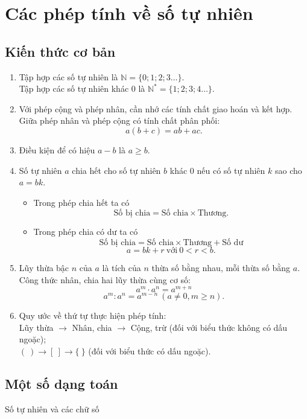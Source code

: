 
\section{Các phép tính về số tự nhiên}
\subsection{Kiến thức cơ bản}
\begin{enumerate}
	\item Tập hợp các số tự nhiên là $\mathbb{N}=\{0;1;2;3 \ldots \}$.\\
	Tập hợp các số tự nhiên khác $0$ là $\mathbb{N}^*=\{1;2;3;4 \ldots \}$.
	\item Với phép cộng và phép nhân, cần nhớ các tính chất giao hoán và kết hợp. Giữa phép nhân và phép cộng có tính chất phân phối:
	$$ a(b+c)=ab+ac. $$
	\item Điều kiện để có hiệu $a-b$ là $a\geq b$.
	\item Số tự nhiên $a$ chia hết cho số tự nhiên $b$ khác $0$ nếu có số tự nhiên $k$ sao cho $a=bk$.
	\begin{itemize}
		\item Trong phép chia hết ta có
		$$ \text{Số bị chia}=\text{Số chia} \times \text{Thương} .$$
		\item Trong phép chia có dư ta có
		$$ \text{Số bị chia}=\text{Số chia} \times \text{Thương}+\text{Số dư} $$
		$$ a=bk+r \ \text{với} \ 0<r<b. $$
	\end{itemize}
	\item Lũy thừa bậc $n$ của $a$ là tích của $n$ thừa số bằng nhau, mỗi thừa số bằng $a$.\\
	Công thức nhân, chia hai lũy thừa cùng cơ số:
	$$ a^m\cdot a^n=a^{m+n} $$
	$$ a^m \colon a^n=a^{m-n} \ (a\ne 0, m\geq n).$$
	\item Quy ước về thứ tự thực hiện phép tính:\\
	Lũy thừa $\to$ Nhân, chia $\to$ Cộng, trừ (đối với biểu thức không có dấu ngoặc);\\
	$ ( \ )  \to [ \ ] \to \{ \ \}$ (đối với biểu thức có dấu ngoặc).
\end{enumerate}
\subsection{Một số dạng toán}
\begin{dang}{Số tự nhiên và các chữ số}
\end{dang}


